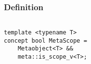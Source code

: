 
\subsubsection{Definition}

\begin{verbatim}

template <typename T>
concept bool MetaScope =
	Metaobject<T> &&
	meta::is_scope_v<T>;

\end{verbatim}
